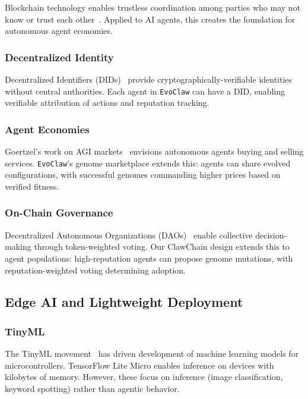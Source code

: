 \documentclass{article}
\newcommand{\evoclaw}{\texttt{EvoClaw}\xspace}
\begin{document}
Blockchain technology enables trustless coordination among parties who may not know or trust each other~\cite{buterin2014ethereum, swan2018blockchain}. Applied to AI agents, this creates the foundation for autonomous agent economies.

\subsubsection{Decentralized Identity}

Decentralized Identifiers (DIDs)~\cite{spencer2015decentralized} provide cryptographically-verifiable identities without central authorities. Each agent in \evoclaw{} can have a DID, enabling verifiable attribution of actions and reputation tracking.

\subsubsection{Agent Economies}

Goertzel's work on AGI markets~\cite{goertzel2017agi} envisions autonomous agents buying and selling services. \evoclaw{}'s genome marketplace extends this: agents can share evolved configurations, with successful genomes commanding higher prices based on verified fitness.

\subsubsection{On-Chain Governance}

Decentralized Autonomous Organizations (DAOs)~\cite{buterin2014ethereum} enable collective decision-making through token-weighted voting. Our ClawChain design extends this to agent populations: high-reputation agents can propose genome mutations, with reputation-weighted voting determining adoption.

\subsection{Edge AI and Lightweight Deployment}

\subsubsection{TinyML}

The TinyML movement~\cite{tinyml} has driven development of machine learning models for microcontrollers. TensorFlow Lite Micro enables inference on devices with kilobytes of memory. However, these focus on inference (image classification, keyword spotting) rather than agentic behavior.
\end{document}
